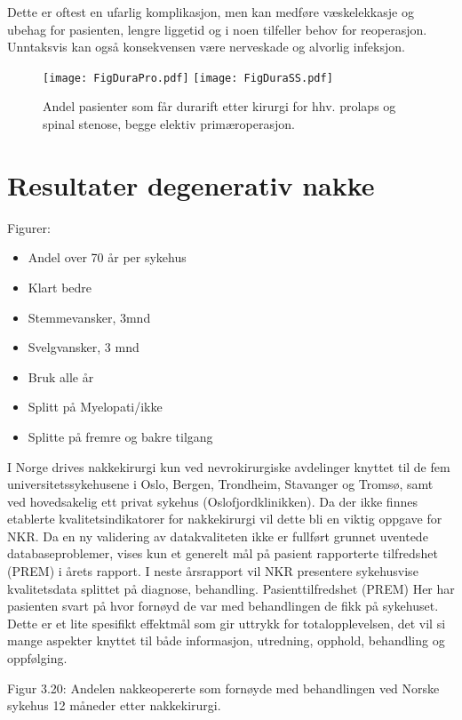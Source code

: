 \documentclass [norsk,a4paper,twoside]{article}\usepackage[]{graphicx}\usepackage[]{color}
\begin{document}

Dette er oftest en ufarlig komplikasjon, men kan medføre væskelekkasje og
ubehag for pasienten, lengre liggetid og i noen tilfeller behov for reoperasjon.
Unntaksvis kan også konsekvensen være nerveskade og alvorlig infeksjon.
\begin{figure}[ht]
\centering \texttt{[image: FigDuraPro.pdf]}
\centering \texttt{[image: FigDuraSS.pdf]}
\caption{\label{fig:Dura} Andel pasienter som får durarift etter kirurgi for hhv. prolaps og spinal stenose, begge elektiv primæroperasjon.}
\end{figure}


\clearpage

\section{Resultater degenerativ nakke}
Figurer:
\begin{itemize}
\item Andel over 70 år per sykehus
\item Klart bedre
\item Stemmevansker, 3mnd
\item Svelgvansker, 3 mnd
\item Bruk alle år
\item Splitt på Myelopati/ikke
\item Splitte på fremre og bakre tilgang
\end{itemize}

I Norge drives nakkekirurgi kun ved nevrokirurgiske avdelinger knyttet til de fem
universitetssykehusene i Oslo, Bergen, Trondheim, Stavanger og Tromsø, samt ved
hovedsakelig ett privat sykehus (Oslofjordklinikken).
Da der ikke finnes etablerte kvalitetsindikatorer for nakkekirurgi vil dette bli en
viktig oppgave for NKR. Da en ny validering av datakvaliteten ikke er fullført grunnet
uventede databaseproblemer, vises kun et generelt mål på pasient rapporterte
tilfredshet (PREM) i årets rapport. I neste årsrapport vil NKR presentere sykehusvise
kvalitetsdata splittet på diagnose, behandling.
Pasienttilfredshet (PREM)
Her har pasienten svart på hvor fornøyd de var med behandlingen de fikk på
sykehuset. Dette er et lite spesifikt effektmål som gir uttrykk for totalopplevelsen,
det vil si mange aspekter knyttet til både informasjon, utredning, opphold,
behandling og oppfølging.

Figur 3.20: Andelen nakkeopererte som fornøyde med behandlingen ved Norske
sykehus 12 måneder etter nakkekirurgi.
\end{document}
